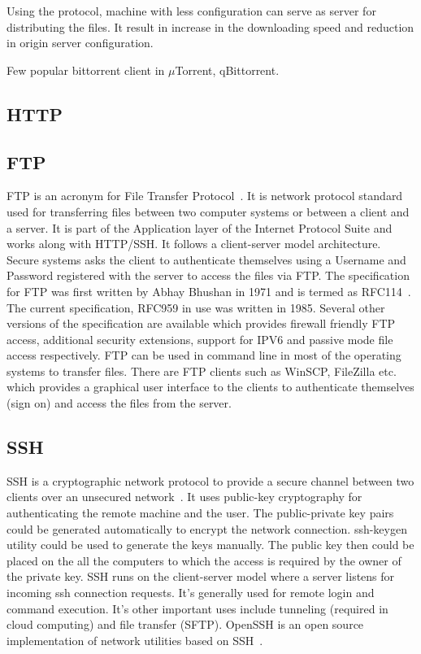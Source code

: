      Using the protocol, machine with less configuration can serve as
     server for distributing the files. It result in increase in the
     downloading speed and reduction in origin server configuration.

     Few popular bittorrent client in $\mu$Torrent, qBittorrent.

     \pv

\subsection{HTTP}
\subsection{FTP }

FTP is an acronym for File Transfer Protocol~\cite{www-ftp-wiki}. It
is network protocol standard used for transferring files between two
computer systems or between a client and a server. It is part of the
Application layer of the Internet Protocol Suite and works along with
HTTP/SSH. It follows a client-server model architecture. Secure
systems asks the client to authenticate themselves using a Username
and Password registered with the server to access the files via
FTP. The specification for FTP was first written by Abhay Bhushan in
1971 and is termed as RFC114~\cite{www-rfc114}. The current
specification, RFC959 in use was written in 1985. Several other
versions of the specification are available which provides firewall
friendly FTP access, additional security extensions, support for IPV6
and passive mode file access respectively. FTP can be used in command
line in most of the operating systems to transfer files. There are FTP
clients such as WinSCP, FileZilla etc. which provides a graphical user
interface to the clients to authenticate themselves (sign on) and
access the files from the server.

     \pv
     
\subsection{SSH}

SSH is a cryptographic network protocol to provide a secure channel
between two clients over an unsecured network~\cite{www-ssh-wiki}. It
uses public-key cryptography for authenticating the remote machine and
the user. The public-private key pairs could be generated
automatically to encrypt the network connection.  ssh-keygen utility
could be used to generate the keys manually.  The public key then
could be placed on the all the computers to which the access is
required by the owner of the private key.  SSH runs on the
client-server model where a server listens for incoming ssh connection
requests. It's generally used for remote login and command
execution. It's other important uses include tunneling (required in
cloud computing) and file transfer (SFTP).  OpenSSH is an open source
implementation of network utilities based on
SSH~\cite{www-openssh-wiki}.

